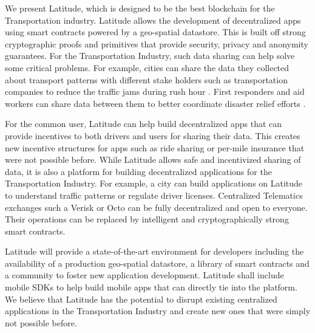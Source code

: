We present Latitude, which is designed to be the best blockchain for the Transportation industry. Latitude allows the
development of decentralized apps using smart contracts powered by a geo-spatial datastore. This is built off strong
cryptographic proofs and primitives that provide security, privacy and anonymity guarantees.  For the Transportation
Industry, such data sharing can help solve some critical problems.  For example, cities can share the data they
collected about transport patterns with different stake holders such as transportation companies to reduce the traffic
jams during rush hour \cite{traffic_jam}. First responders and aid workers can share data between them to better coordinate
disaster relief efforts \cite{bharosa_2010}.

For the common user, Latitude can help build decentralized apps that can provide incentives to both drivers and users
for sharing their data. This creates new incentive structures for apps such as ride sharing or per-mile insurance that
were not possible before. While Latitude allows safe and incentivized sharing of data, it is also a platform for
building decentralized applications for the Transportation Industry. For example, a city can build applications on
Latitude to understand traffic patterns or regulate driver licenses. Centralized Telematics exchanges such a Verisk or
Octo can be fully decentralized and open to everyone. Their operations can be replaced by intelligent and
cryptographically strong smart contracts.

Latitude will provide a state-of-the-art environment for developers including the availability of a production
geo-spatial datastore, a library of smart contracts and a community to foster new application development. Latitude
shall include mobile SDKs to help build mobile apps that can directly tie into the platform. We believe that Latitude
has the potential to disrupt existing centralized applications in the Transportation Industry and create new ones that
were simply not possible before.

%
%

